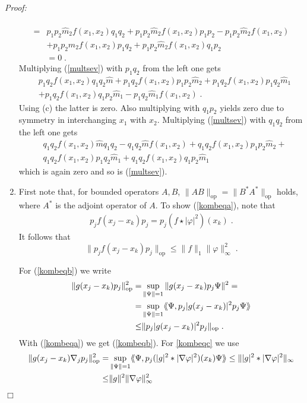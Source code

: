 \documentclass[11pt, english, american]{article}
\newcommand{\laa}{\langle\hspace{-0.08cm}\langle}
\newcommand{\raa}{\rangle\hspace{-0.08cm}\rangle}
\newenvironment{proof}{\emph{Proof:}}{\begin{flushright} $ \Box $ \end{flushright}}
\renewcommand{\phi}{\varphi}
\begin{document}
\begin{proof}
\begin{enumerate}
\begin{align*}
%
\\=&p_1p_2\widehat{m}_2f(x_1,x_2)q_1q_2+p_1p_2\widehat{m}_2 f(x_1,x_2)p_1p_2-p_1p_2\widehat{m}_2f(x_1,x_2)
\\&+p_1p_2\widehat{m}_2 f(x_1,x_2)p_1q_2+p_1p_2\widehat{m}_2 f(x_1,x_2)q_1p_2%
\\&=0\;.
\end{align*}
Multiplying (\ref{multsev}) with $p_1q_2$ from the left one gets
\begin{align*}
&p_1q_2f(x_1,x_2)q_1q_2\widehat{m}+p_1q_2f(x_1,x_2)p_1p_2\widehat{m}_2+
p_1q_2f(x_1,x_2)p_1q_2\widehat{m}_1\\&+p_1q_2f(x_1,x_2)q_1p_2\widehat{m}_1-p_1q_2\widehat{m}_1f(x_1,x_2)
\;.
%
\end{align*}
Using (c) the latter is zero. Also multiplying with $q_1p_2$ yields zero due to symmetry in interchanging
$x_1$ with $x_2$.
Multiplying (\ref{multsev}) with $q_1q_2$ from the left one gets
\begin{align*}
&q_1q_2f(x_1,x_2)\widehat{m}q_1q_2-q_1q_2\widehat{m}f(x_1,x_2)+
q_1q_2f(x_1,x_2)p_1p_2\widehat{m}_2+\\&q_1q_2f(x_1,x_2)p_1q_2\widehat{m}_1+q_1q_2f(x_1,x_2)q_1p_2\widehat{m}_1
\end{align*}
which is again zero and so is (\ref{multsev}).
\item 
First note that, for bounded operators $A, B$,
$\| A B \|_{\text{op}}=\|  B^* A^* \|_{\text{op}}$ holds, where $A^*$ is the adjoint operator of $A$.
To show (\ref{kombeqa}), note that
\begin{align} p_j f(x_j-x_k)p_j=p_j (f\star|\phi|^2)(x_k)\;.
\label{faltungorigin}
\end{align}
It follows that $$\|p_j f(x_j-x_k)p_j\|_{\text{op}}\leq  \|f\|_1\|\phi\|_\infty^2\;.$$

For (\ref{kombeqb}) we write
\begin{align*}
\|g(x_j-x_k)p_j\|_{\text{op}}^2=&\sup_{\|\Psi\|=1}\|g(x_j-x_k)p_j\Psi\|^2=
\\=&\sup_{\|\Psi\|=1}\laa \Psi,p_j  |g(x_j-x_k)|^2 p_j\Psi\raa\\\leq& \|p_j  |g(x_j-x_k)|^2p_j\|_{\text{op}}\;.
\end{align*}
With (\ref{kombeqa}) we get (\ref{kombeqb}).
For \eqref{kombeqc} we use
\begin{align*}
\| g(x_j-x_k) \nabla_j p_j \|_{\text{op}}^ 2 
=&
\sup_{\|\Psi\|=1}
\laa \Psi,
p_j
(|g|^ 2 * |\nabla \phi|^2)(x_k)
\Psi \raa
\leq
\||g|^ 2 * |\nabla \phi|^2\|_{\infty}
 \\
 \leq
 &
 \|g\|^2 \| \nabla \phi \|_\infty^2
\end{align*}


\end{enumerate}
\end{proof}
\end{document}
